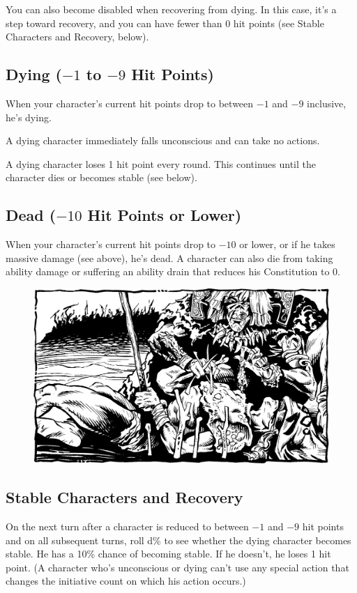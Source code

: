You can also become disabled when recovering from dying. In this case, it's a step toward recovery, and you can have fewer than 0 hit points (see Stable Characters and Recovery, below).

\subsection{Dying ($-1$ to $-9$ Hit Points)}
When your character's current hit points drop to between $-1$ and $-9$ inclusive, he's dying.

A dying character immediately falls unconscious and can take no actions.

A dying character loses 1 hit point every round. This continues until the character dies or becomes stable (see below).

\subsection{Dead ($-10$ Hit Points or Lower)}
When your character's current hit points drop to $-10$ or lower, or if he takes massive damage (see above), he's dead. A character can also die from taking ability damage or suffering an ability drain that reduces his Constitution to 0.

\begin{figure}[t!]
\centering
\includegraphics[width=\textwidth]{images/heal-1.png}
\WOTC
\end{figure}
\subsection{Stable Characters and Recovery}
On the next turn after a character is reduced to between $-1$ and $-9$ hit points and on all subsequent turns, roll d\% to see whether the dying character becomes stable. He has a 10\% chance of becoming stable. If he doesn't, he loses 1 hit point. (A character who's unconscious or dying can't use any special action that changes the initiative count on which his action occurs.)


